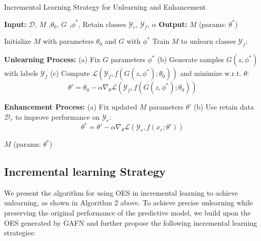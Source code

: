 \documentclass[preprint,12pt]{elsarticle}
\begin{document}
\begin{algorithm}[h]
\caption{Incremental Learning Strategy for Unlearning and Enhancement}
\begin{algorithmic}[1]
\STATE \textbf{Input:}  $\mathcal{D}$,  $M$ ,$\theta_0$, $G$ ,$\phi^*$, Retain classes $\mathcal{Y}_r$, $\mathcal{Y}_f$,  $\alpha$
\STATE \textbf{Output:}  $M$ (params: $\theta^*$)

\STATE Initialize $M$ with parameters $\theta_0$ and $G$ with $\phi^*$
\STATE Train $M$ to unlearn classes $\mathcal{Y}_f$:

\STATE \quad \textbf{Unlearning Process:}
\STATE \quad \quad (a) Fix $G$ parameters $\phi^*$
\STATE \quad \quad (b) Generate samples $G(z, \phi^*)$ with labels $\mathcal{Y}_f$
\STATE \quad \quad (c) Compute $\mathcal{L}(\mathcal{Y}_f, f(G(z, \phi^*); \theta_0))$ and minimize w.r.t. $\theta$:
\[
\theta' = \theta_0 - \alpha \nabla_\theta \mathcal{L}(\mathcal{Y}_f, f(G(z, \phi^*); \theta_0))
\]

\STATE \quad \textbf{Enhancement Process:}
\STATE \quad \quad (a) Fix updated $M$ parameters $\theta'$
\STATE \quad \quad (b) Use retain data $\mathcal{D}_r$ to improve performance on $\mathcal{Y}_r$:
\[
\theta^* = \theta' - \alpha \nabla_\theta \mathcal{L}(\mathcal{Y}_r, f(x_r; \theta'))
\]

\RETURN $M$ (params: $\theta^*$)
\end{algorithmic}
\end{algorithm}


\subsection{Incremental learning Strategy}

We present the algorithm for using OES in incremental learning to achieve unlearning, as shown in Algorithm 2 above. To achieve precise unlearning while preserving the original performance of the predictive model, we build upon the OES generated by GAFN and further propose the following incremental learning strategies:
\end{document}
